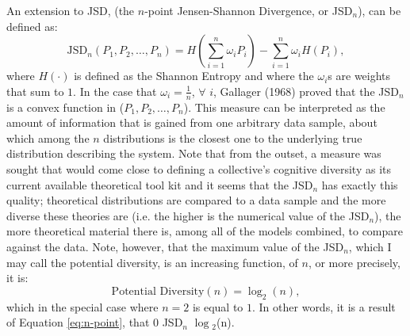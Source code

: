 \documentclass[11pt]{article}
\begin{document}
An extension to JSD, (the $n$-point Jensen-Shannon Divergence, or JSD$_n$), can be defined as:
\begin{equation} \label{eq:n-point}
\text{JSD}_n(P_1, P_2, \ldots, P_n)=H\left(\sum_{i=1}^n \omega_i P_i\right)-\sum_{i=1}^n \omega_i H(P_i),
\end{equation}
where $H(\cdot)$ is defined as the Shannon Entropy and where the $\omega$$_{i}$s are weights that sum to $1$. In the case that $\omega_i=\frac{1}{n}$, $\forall$ $i$, Gallager (1968) proved that the JSD$_n$ is a convex function in ($P_1, P_2, \ldots, P_n$). This measure can be interpreted as the amount of information that is gained from one arbitrary data sample, about which among the $n$ distributions is the closest one to the underlying true distribution describing the system. Note that from the outset, a measure was sought that would come close to defining a collective's cognitive diversity as its current available theoretical tool kit and it seems that the JSD$_n$ has exactly this quality; theoretical distributions are compared to a data sample and the more diverse these theories are (i.e. the higher is the numerical value of the JSD$_n$), the more theoretical material there is, among all of the models combined, to compare against the data. Note, however, that the maximum value of the JSD$_n$, which I may call the potential diversity, is an increasing function, of $n$, or more precisely, it is:
\begin{equation} \label{eq:potential}
\text{Potential Diversity}(n)=\log_2(n),
\end{equation}
which in the special case where $n=2$ is equal to $1$. In other words, it is a result of Equation \ref{eq:n-point}, that 0 \leq \mbox{JSD}$_n$ \leq $\log$$_2$(n).
\end{document}
